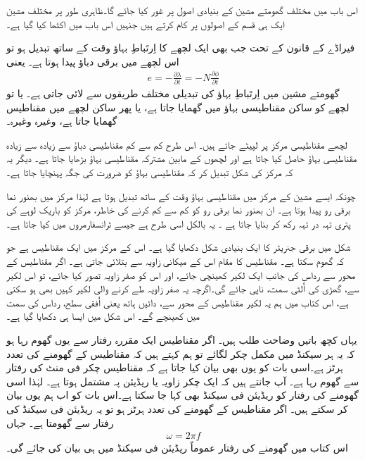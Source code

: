اس باب میں مختلف گھومتے مشین کے بنیادی اصول پر غور کیا جائے گا۔ظاہری طور پر مختلف مشین ایک ہی قسم کے اصولوں پر کام کرتے ہیں جنہیں اس باب میں اکٹھا کیا گیا ہے۔

فیراڈے کے قانون کے تحت جب بھی ایک لچھے کا اِرتَباطِ بہاؤ   وقت کے ساتھ تبدیل ہو تو اس لچھے میں برقی دباؤ پیدا ہوتا ہے۔ یعنی
\begin{align}
e=-\frac{\partial \lambda}{\partial t}=-N \frac{\partial \phi}{\partial t}
\end{align}
گھومتے مشین میں اِرتَباطِ بہاؤ کی تبدیلی مختلف طریقوں سے لائی جاتی ہے۔ یا تو لچھے کو ساکن مقناطیسی بہاؤ میں گھمایا جاتا ہے، یا پھر ساکن لچھے میں مقناطیس گھمایا جاتا ہے، وغیرہ وغیرہ۔

لچھے مقناطیسی مرکز  پر لپیٹے جاتے ہیں۔ اس طرح کم سے کم مقناطیسی دباؤ سے زیادہ سے زیادہ مقناطیسی بہاؤ حاصل کیا جاتا ہے اور لچھوں کے مابین مشترکہ مقناطیسی بہاؤ بڑھایا جاتا ہے۔ دیگر یہ کہ مرکز کی شکل تبدیل کر کہ مقناطیسی بہاؤ کو ضرورت کی جگہ پہنچایا جاتا ہے۔

چونکہ ایسے مشین کے مرکز میں مقناطیسی بہاؤ وقت کے ساتھ تبدیل ہوتا ہے لہٰذا مرکز میں بھنور نما برقی رو پیدا ہوتا ہے۔ ان بھنور نما برقی رو کو کم سے کم کرنے کی خاطر، مرکز کو باریک لوہے کی پتری تہہ در تہہ رکھ کر بنایا جاتا ہے ۔ یہ بالکل اسی طرح ہے جیسے ٹرانسفارمروں میں کیا جاتا ہے۔

شکل  میں برقی جنریٹر کا ایک بنیادی شکل دکھایا گیا ہے۔ اس کے مرکز میں ایک مقناطیس ہے جو کہ گھوم سکتا ہے۔ مقناطیس کا مقام اس کے میکانی زاویہ  سے بتلائی جاتی ہے۔ اگر مقناطیس کے محور سے رداس کی جانب  ایک لکیر کھینچی جائے، اور اس کو صفر زاویہ تصور کیا جائے، تو  اس لکیر سے، گھڑی کی اُلٹی سمت، ناپی جائے گی۔اگرچہ یہ صفر زاویہ طے کرنے والی لکیر کہیں بھی ہو سکتی ہے، اس کتاب میں ہم یہ لکیر مقناطیس کے محور سے،  دائیں ہاتھ یعنی اُفقی سطح، رداس کی سمت میں کھینچے گے۔ اس شکل میں ایسا ہی دکھایا گیا ہے۔

یہاں کچھ باتیں وضاحت طلب ہیں۔ اگر مقناطیس ایک مقررہ رفتار سے یوں گھوم رہا ہو کہ یہ ہر سیکنڈ میں    مکمل چکر لگائے تو ہم کہتے ہیں کہ مقناطیس کے گھومنے کی تعدد   ہرٹز ہے۔اسی بات کو یوں بھی بیان کیا جاتا ہے کہ مقناطیس  چکر فی منٹ کی رفتار سے گھوم رہا ہے۔ آپ جانتے ہیں کہ ایک چکر  زاویہ یا  ریڈیئن  پہ مشتمل ہوتا ہے۔ لہٰذا اسی گھومنے کی رفتار کو  ریڈیئن فی سیکنڈ بھی کہا جا سکتا ہے۔اس بات کو اب ہم یوں بیان کر سکتے ہیں۔ اگر مقناطیس کے گھومنے کی تعدد  ہرٹز ہو تو یہ  ریڈیئن فی سیکنڈ کی رفتار سے گھومتا ہے۔ جہاں
\begin{align}
\omega =2\pi f
\end{align}
اس کتاب میں گھومنے کی رفتار عموماً ریڈیئن فی سیکنڈ میں ہی بیان کی جائے گی۔

